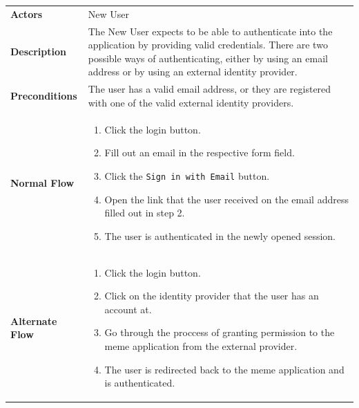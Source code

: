 \renewcommand{\arraystretch}{1.8}

\newenvironment{usecaseenum}[1][]
{
    \vspace{-0.5\baselineskip}
    \begin{enumerate}[#1,noitemsep,topsep=0pt,partopsep=0pt,parsep=0pt,after=\vspace{-\baselineskip},align=left,widest*=1,labelsep=1pt]
        }
        {
    \end{enumerate}
}

\noindent
\begin{longtable}{@{}>{\raggedright\arraybackslash}p{3cm} p{11cm}}
    \hline
    \multicolumn{2}{c}{\textbf{Authenticate}}
    \\
    \hline

    \textbf{Actors}         & New User
    \\

    \textbf{Description}    & The New User expects to be able to authenticate into the application by providing valid credentials. There are two possible ways of authenticating, either by using an email address or by using an external identity provider.
    \\

    \textbf{Preconditions}  & The user has a valid email address, or they are registered with one of the valid external identity providers.
    \\

    \textbf{Normal Flow}    & \begin{usecaseenum}
                                  \item Click the login button.
                                  \item Fill out an email in the respective form field.
                                  \item Click the \texttt{Sign in with Email} button.
                                  \item Open the link that the user received on the email address filled out in step 2.
                                  \item The user is authenticated in the newly opened session.
                              \end{usecaseenum}
    \\
    \textbf{Alternate Flow} & \begin{usecaseenum}
                                  \item Click the login button.
                                  \item Click on the identity provider that the user has an account at.
                                  \item Go through the proccess of granting permission to the meme application from the external provider.
                                  \item The user is redirected back to the meme application and is authenticated.
                              \end{usecaseenum}
    \\


\end{longtable}
